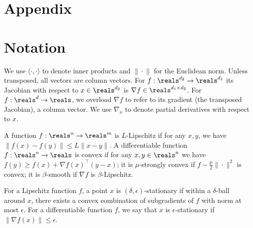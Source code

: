 \appendix
\section*{Appendix}

\section{Notation}\label{sec:appendix_notation}
We use $\langle \cdot{}, {}\cdot\rangle$ to denote inner products and $\|{}\cdot{}\|$ for the Euclidean norm. Unless transposed, all vectors are column vectors. For $f:\reals^{d_2}\to\reals^{d_1}$ its Jacobian with respect to $x\in \reals^{d_2}$ is 
$\nabla f\in \reals^{d_1 \times d_2}$.  For $f:\reals^d\to\reals$, we overload  $\nabla f$ to refer to its gradient (the transposed Jacobian), a column vector. We use 
$\nabla_x$ to denote partial derivatives with respect to $x$.  

A function $f:\reals^n\to\reals^m$ is $L$-Lipschitz if for any $x,y$, we have $\|f(x) - f(y)\|\leq L \|x-y\|$.
A differentiable function $f:\reals^n\to\reals$ is convex if for any $x, y\in \reals^n$ we have $f(y)\geq f(x) + \nabla f(x)^\top (y-x)$; 
it is 
 $\mu$-strongly convex
 if $f - \tfrac{\mu}{2}\|{}\cdot{}\|^2$ is convex;
it is  $\beta$-smooth
if
$\nabla f$ is $\beta$-Lipschitz.

For a Lipschitz function $f$, a point $x$ is $(\delta, \epsilon)$-stationary if within a $\delta$-ball around $x$, there exists a convex combination of  subgradients of $f$ with norm at most $\epsilon$. 
For a differentiable function $f$, we say that $x$ is $\epsilon$-stationary if $\|\nabla f(x)\|\leq \epsilon$. 







